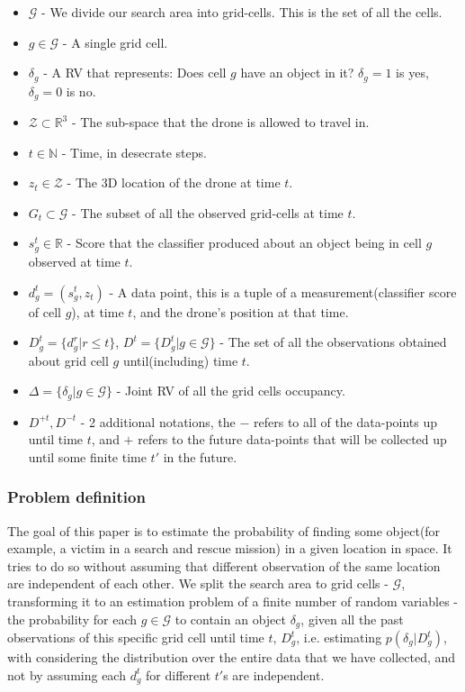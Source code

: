 \documentclass{article}
\begin{document}
	\begin{itemize}
		\item $\mathcal{G}$ - We divide our search area into grid-cells. This is the set of all the cells.
		\item $g \in \mathcal{G}$ - A single grid cell.
		\item $\delta_g$ - A RV that represents: Does cell $g$ have an object in it? $\delta_g = 1$ is yes, $\delta_g = 0$ is no. 
		\item $\mathcal{Z} \subset \mathbb{R}^3$ - The sub-space that the drone is allowed to travel in. 
		\item $t \in \mathbb{N}$ - Time, in desecrate steps.	
		\item $z_t \in \mathcal{Z}$ - The 3D location of the drone at time $t$.
		\item $G_t \subset \mathcal{G}$ - The subset of all the observed grid-cells at time $t$.
		\item $s_g^t \in \mathbb{R}$ - Score that the classifier produced about an object being in cell $g$ observed at time $t$.   
		\item $d^t_g = (s_g^t, z_t)$ - A data point, this is a tuple of a measurement(classifier score of cell $g$), at time $t$, and the drone's position at that time.
		\item $D_g^t = \{d_g^r|r \leq t\}$, $D^t=\{D_g^t|g\in\mathcal{G}\}$ - The set of all the observations obtained about grid cell $g$ until(including) time $t$. 
		\item $\Delta = \{\delta_g|g\in\mathcal{G}\}$ - Joint RV of all the grid cells occupancy.
		\item $D^{+t},D^{-t}$ - 2 additional notations, the $-$ refers to all of the data-points up until time $t$, and $+$ refers to the future data-points that will be collected up until some finite time $t'$ in the future.
	\end{itemize}

	\subsubsection{Problem definition}
	The goal of this paper is to estimate the probability of finding some object(for example, a victim in a search and rescue mission) in a given location in space. It tries to do so without assuming that different observation of the same location are independent of each other. We split the search area to grid cells - $\mathcal{G}$, transforming it to an estimation problem of a finite number of random variables - the probability for each $g \in \mathcal{G}$ to contain an object $\delta_g$, given all the past observations of this specific grid cell until time $t$, $D_g^t$, i.e. estimating $p(\delta_g|D_g^t)$, with considering the distribution over the entire data that we have collected, and not by assuming each $d^t_g$ for different $t'$s are independent. \\
	
\end{document}
